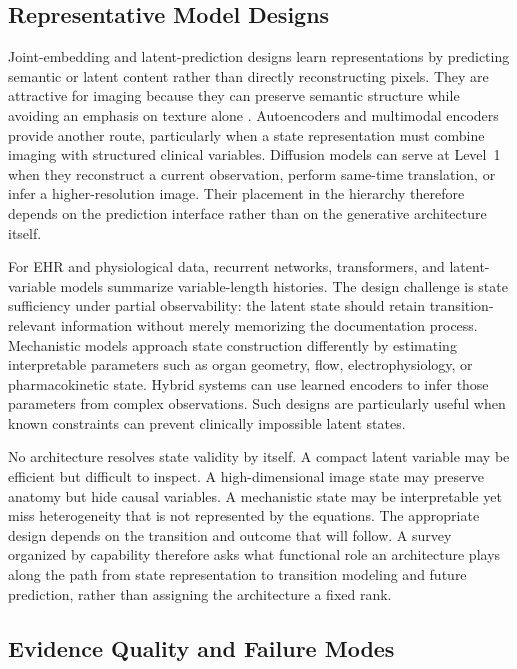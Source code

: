 \subsection{Representative Model Designs}

Joint-embedding and latent-prediction designs learn representations by predicting semantic or latent content rather than directly reconstructing pixels. They are attractive for imaging because they can preserve semantic structure while avoiding an emphasis on texture alone \citep{assran2023self,yue2025chexworld}. Autoencoders and multimodal encoders provide another route, particularly when a state representation must combine imaging with structured clinical variables. Diffusion models can serve at Level~1 when they reconstruct a current observation, perform same-time translation, or infer a higher-resolution image. Their placement in the hierarchy therefore depends on the prediction interface rather than on the generative architecture itself.

For EHR and physiological data, recurrent networks, transformers, and latent-variable models summarize variable-length histories. The design challenge is state sufficiency under partial observability: the latent state should retain transition-relevant information without merely memorizing the documentation process. Mechanistic models approach state construction differently by estimating interpretable parameters such as organ geometry, flow, electrophysiology, or pharmacokinetic state. Hybrid systems can use learned encoders to infer those parameters from complex observations. Such designs are particularly useful when known constraints can prevent clinically impossible latent states.

No architecture resolves state validity by itself. A compact latent variable may be efficient but difficult to inspect. A high-dimensional image state may preserve anatomy but hide causal variables. A mechanistic state may be interpretable yet miss heterogeneity that is not represented by the equations. The appropriate design depends on the transition and outcome that will follow. A survey organized by capability therefore asks what functional role an architecture plays along the path from state representation to transition modeling and future prediction, rather than assigning the architecture a fixed rank.

\subsection{Evidence Quality and Failure Modes}

